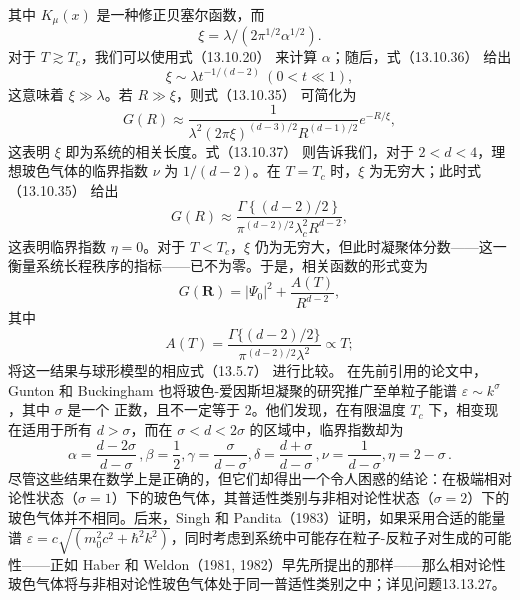 其中 \(K_{\mu}(x)\) 是一种修正贝塞尔函数，而
\begin{equation}\tag{13.6.44}\label{eq:13.6.44}
\xi = \lambda / ( 2 \pi ^{1 / 2} \alpha ^{1 / 2} ) .
\end{equation}
对于 \(T \gtrsim T_{c}\)，我们可以使用式（13.10.20） 来计算 \(\alpha\)；随后，式（13.10.36） 给出
\begin{equation}\tag{13.6.45}\label{eq:13.6.45}
\xi \sim \lambda t ^{- 1 / ( d - 2 )} \ ( 0 < t \ll 1 ) ,
\end{equation}
这意味着 \(\xi \gg \lambda\)。若 \(R \gg \xi\)，则式（13.10.35） 可简化为
\begin{equation}\tag{13.6.46}\label{eq:13.6.46}
G ( R ) \approx \frac { 1 } { \lambda ^{2} ( 2 \pi \xi ) ^{( d - 3 ) / 2} R ^{( d - 1 ) / 2} } e ^{- R / \xi} ,
\end{equation}
这表明 \(\xi\) 即为系统的相关长度。式（13.10.37） 则告诉我们，对于 \(2 < d < 4\)，理想玻色气体的临界指数 \(\nu\) 为 \(1/(d-2)\)。在 \(T = T_c\) 时，\(\xi\) 为无穷大；此时式（13.10.35） 给出
\begin{equation}\tag{13.6.47}\label{eq:13.6.47}
G ( R ) \approx \frac { \Gamma \left\{ ( d - 2 ) / 2 \right\} } { \pi ^{( d - 2 ) / 2} \lambda _ { c } ^{2} R ^{d - 2} } ,
\end{equation}
这表明临界指数 \(\eta=0\)。对于 \(T < T_{c}\)，\(\xi\) 仍为无穷大，但此时凝聚体分数——这一衡量系统长程秩序的指标——已不为零。于是，相关函数的形式变为
\begin{equation}\tag{13.6.48}\label{eq:13.6.48}
G ( \pmb { R } ) = | \Psi _ { 0 } | ^{2} + \frac { A ( T ) } { R ^{d - 2} } ,
\end{equation}
其中
\begin{equation}\tag{13.6.49}\label{eq:13.6.49}
A ( T ) = \frac { \Gamma \{ ( d - 2 ) / 2 \} } { \pi ^{( d - 2 ) / 2} \lambda ^{2} } \propto T ;
\end{equation}
将这一结果与球形模型的相应式（13.5.7） 进行比较。
在先前引用的论文中，Gunton 和 Buckingham 也将玻色-爱因斯坦凝聚的研究推广至单粒子能谱 \(\varepsilon \sim k^{\sigma}\)，其中 \(\sigma\) 是一个
正数，且不一定等于 2。他们发现，在有限温度 \(T_{c}\) 下，相变现在适用于所有 \(d > \sigma\)，而在 \(\sigma < d < 2\sigma\) 的区域中，临界指数却为
\begin{equation}\tag{13.6.50}\label{eq:13.6.50}
\alpha = \frac { d - 2 \sigma } { d - \sigma } \, ,  \beta = \frac { 1 } { 2 } ,  \gamma = \frac { \sigma } { d - \sigma } ,  \delta = \frac { d + \sigma } { d - \sigma } \, ,  \nu = \frac { 1 } { d - \sigma } ,  \eta = 2 - \sigma \, .
\end{equation}
尽管这些结果在数学上是正确的，但它们却得出一个令人困惑的结论：在极端相对论性状态（\(\sigma=1\)）下的玻色气体，其普适性类别与非相对论性状态（\(\sigma=2\)）下的玻色气体并不相同。后来，Singh 和 Pandita（1983）证明，如果采用合适的能量谱 \(\varepsilon=c\sqrt{(m_{0}^{2}c^{2}+\hbar^{2}k^{2})}\)，同时考虑到系统中可能存在粒子-反粒子对生成的可能性——正如 Haber 和 Weldon（1981, 1982）早先所提出的那样——那么相对论性玻色气体将与非相对论性玻色气体处于同一普适性类别之中；详见问题13.13.27。
